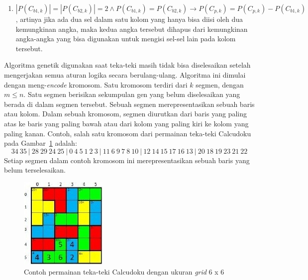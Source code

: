 \documentclass[a4paper,twoside]{article}
\begin{document}
\begin{enumerate}
\begin{enumerate}
\item \begin{math}|P(C_{b1,k})| = |P(C_{b2,k})| = 2 \land P(C_{b1,k}) = P(C_{b2,k}) \rightarrow P(C_{p,k}) = P(C_{p,k}) - P(C_{b1,k})\end{math}, artinya jika ada dua sel dalam satu kolom yang hanya bisa diisi oleh dua kemungkinan angka, maka kedua angka tersebut dihapus dari kemungkinan angka-angka yang bisa digunakan untuk mengisi sel-sel lain pada kolom tersebut.
\end{enumerate}

Algoritma genetik digunakan saat teka-teki masih tidak bisa diselesaikan setelah mengerjakan semua aturan logika secara berulang-ulang. Algoritma ini dimulai dengan meng-\textit{encode} kromosom. Satu kromosom terdiri dari \begin{math}k\end{math} segmen, dengan \begin{math}m \leq n\end{math}. Satu segmen berisikan sekumpulan gen yang belum diselesaikan yang berada di dalam segmen tersebut. Sebuah segmen merepresentasikan sebuah baris atau kolom. Dalam sebuah kromosom, segmen diurutkan dari baris yang paling atas ke baris yang paling bawah atau dari kolom yang paling kiri ke kolom yang paling kanan. Contoh, salah satu kromosom dari permainan teka-teki Calcudoku pada Gambar~\ref{fig:hybrid8} adalah: \begin{displaymath}34 \ 35 \ | \ 28 \ 29 \ 24 \ 25 \ | \ 0 \ 4 \ 5 \ 1 \ 2 \ 3 \ | \ 11 \ 6 \ 9 \ 7 \ 8 \ 10 \ | \ 12 \ 14 \ 15 \ 17 \ 16 \ 13 \ | \ 20 \ 18 \ 19 \ 23 \ 21 \ 22\end{displaymath} Setiap segmen dalam contoh kromosom ini merepresentasikan sebuah baris yang belum terselesaikan.

\begin{figure}
\centering
\captionsetup{justification=centering}
\includegraphics[scale=1]{Gambar/HybridGenetic8}
\caption[Contoh permainan teka-teki Calcudoku dengan ukuran \textit{grid} 6 x 6~\cite{JohannaLukasSaputra}]{Contoh permainan teka-teki Calcudoku dengan ukuran \textit{grid} 6 x 6 ~\cite{JohannaLukasSaputra}}
\label{fig:hybrid8}
\end{figure}


\end{enumerate}
\end{document}
